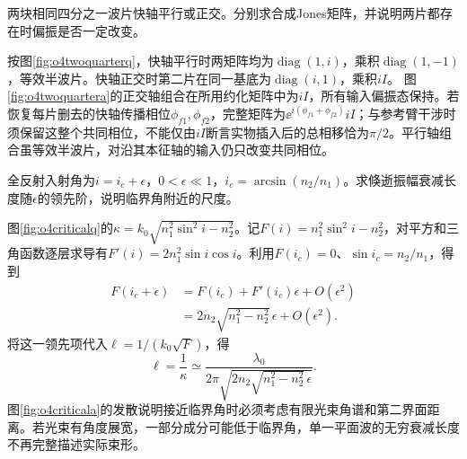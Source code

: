 \begin{exercise}\label{ex:o4twoquarter}
两块相同四分之一波片快轴平行或正交。分别求合成Jones矩阵，并说明两片都存在时偏振是否一定改变。
\end{exercise}
\begin{solution}
按图\ref{fig:o4twoquarterq}，快轴平行时两矩阵均为$\operatorname{diag}(1,i)$，乘积$\operatorname{diag}(1,-1)$，等效半波片。快轴正交时第二片在同一基底为$\operatorname{diag}(i,1)$，乘积$iI$。
图\ref{fig:o4twoquartera}的正交轴组合在所用约化矩阵中为$iI$，所有输入偏振态保持。若恢复每片删去的快轴传播相位$\phi_{f1},\phi_{f2}$，完整矩阵为$\ee^{i(\phi_{f1}+\phi_{f2})}iI$；与参考臂干涉时须保留这整个共同相位，不能仅由$iI$断言实物插入后的总相移恰为$\pi/2$。平行轴组合虽等效半波片，对沿其本征轴的输入仍只改变共同相位。
\end{solution}

\begin{exercise}\label{ex:o4criticaldecay}
全反射入射角为$i=i_c+\epsilon$，$0<\epsilon\ll1$，$i_c=\arcsin(n_2/n_1)$。求倏逝振幅衰减长度随$\epsilon$的领先阶，说明临界角附近的尺度。
\end{exercise}
\begin{solution}
图\ref{fig:o4criticalq}的$\kappa=k_0\sqrt{n_1^2\sin^2i-n_2^2}$。记$F(i)=n_1^2\sin^2i-n_2^2$，对平方和三角函数逐层求导有$F'(i)=2n_1^2\sin i\cos i$。利用$F(i_c)=0$、$\sin i_c=n_2/n_1$，得到
\begin{align*}
 F(i_c+\epsilon)&=F(i_c)+F'(i_c)\epsilon+O(\epsilon^2)\\
 &=2n_2\sqrt{n_1^2-n_2^2}\,\epsilon+O(\epsilon^2).
\end{align*}
将这一领先项代入$\ell=1/(k_0\sqrt F)$，得
\[
 \ell=\frac1\kappa\simeq
 \frac{\lambda_0}{2\pi\sqrt{2n_2\sqrt{n_1^2-n_2^2}\,\epsilon}}.
\]
图\ref{fig:o4criticala}的发散说明接近临界角时必须考虑有限光束角谱和第二界面距离。若光束有角度展宽，一部分成分可能低于临界角，单一平面波的无穷衰减长度不再完整描述实际束形。
\end{solution}

